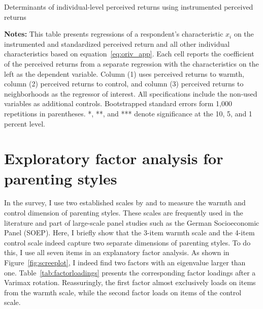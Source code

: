 \documentclass[12pt, a4paper, english]{article}
\begin{document}
\begin{table}[h!]\centering
    \caption{Determinants of individual-level perceived returns using instrumented perceived returns}\label{tab:determinants_oriv}
    \begin{footnotesize}
         
    \end{footnotesize}
    \vspace{0.5em}
    \caption*{\footnotesize \textbf{Notes:} This table presents regressions of a respondent's characteristic $x_i$ on the instrumented and standardized perceived return and all other individual characteristics based on equation~\eqref{eq:oriv_app}. Each cell reports the coefficient of the perceived returns from a separate regression with the characteristics on the left as the dependent variable. Column (1) uses perceived returns to warmth, column (2) perceived returns to control, and column (3) perceived returns to neighborhoods as the regressor of interest. All specifications include the non-used variables as additional controls. Bootstrapped standard errors form 1,000 repetitions in parentheses. *, **, and *** denote significance at the 10, 5, and 1 percent level.}
\end{table}


\clearpage
\section{Exploratory factor analysis for parenting styles}\label{app:efa}
\setcounter{table}{0}
\setcounter{figure}{0}
\setcounter{footnote}{0}

In the survey, I use two established scales by \citet{Perrisetal1980} and \citet{Schwarzetal1997} to measure the warmth and control dimension of parenting styles. These scales are frequently used in the literature \citep[e.g.,][]{Deckersetal2017Balu} and part of large-scale panel studies such as the German Socioeconomic Panel (SOEP). Here, I briefly show that the 3-item warmth scale and the 4-item control scale indeed capture two separate dimensions of parenting styles. To do this, I use all seven items in an explanatory factor analysis. As shown in Figure~\ref{fig:screeplot}, I indeed find two factors with an eigenvalue larger than one. Table~\ref{tab:factorloadings} presents the corresponding factor loadings after a Varimax rotation. Reassuringly, the first factor almost exclusively loads on items from the warmth scale, while the second factor loads on items of the control scale.
\end{document}

